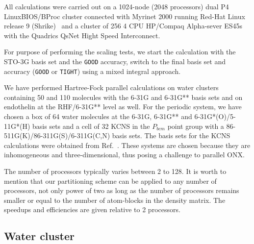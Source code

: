 \documentclass[prl,twocolumn,twocolumngrid,superbib]{revtex4} %
\begin{document}
 All calculations were carried out on a 1024-node (2048 processors) 
 dual P4 LinuxBIOS/BProc cluster connected with Myrinet 2000 running
 Red-Hat Linux release 9 (Shrike)~\cite{RedHat90} and a cluster of 256 
 4 CPU HP/Compaq Alpha-sever ES45s with the Quadrics QsNet Hight Speed Interconnect. 

 For purpose of performing the scaling tests, we start the calculation 
 with the STO-3G basis set and the {\tt GOOD} accuracy, switch to
 the final basis set and accuracy ({\tt GOOD} or {\tt TIGHT}) using a mixed 
 integral approach. 

 We have performed Hartree-Fock parallel calculations on 
 water clusters containing 50 and 110 molecules with 
 the 6-31G and 6-31G** basis sets and on endothelin at the RHF/6-31G** level as well.
 For the periodic system, we have chosen a box of 64 water molecules
 at the 6-31G, 6-31G** and 6-31G*(O)/5-11G*(H) basis sets
 and a cell of 32 KCNS in the $P_{bcm}$ point group with
 a 86-511G(K)/86-311G(S)/6-311G(C,N) basis sets.
 The basis sets for the KCNS calculations were obtained from 
 Ref.~\cite{CrystalLib}.
 These systems are chosen because
 they are inhomogeneous and three-dimensional, thus posing a challenge
 to parallel ONX.

 The number of processors typically varies between 2 to 128. 
 It is worth to mention that our partitioning scheme can be 
 applied to any number of processors, not only power of two 
 as long as the number of processors remains smaller or equal 
 to the number of atom-blocks in the density matrix.
 The speedups and efficiencies are given relative to 2 processors.

\subsection{Water cluster}
\end{document}
